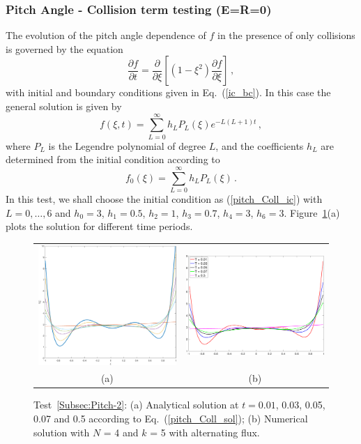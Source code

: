 \documentclass[preprint,11pt]{elsarticle}
\newcommand{\bq}{\begin{equation}}
\newcommand{\eq}{\end{equation}}
\begin{document}
\subsubsection{Pitch Angle - Collision term testing (E=R=0)}
\label{sec:pitch-angle-C}
The evolution of the pitch angle dependence of $f$ in the presence of only collisions is governed by the equation
%
\bq
\label{pitch_Coll_eq}
\frac{\partial f}{\partial t}= \frac{\partial}{\partial\xi} \left[ \left(1-\xi^2\right) \frac{\partial f}{\partial \xi} \right] \, ,
\eq
%
with initial and boundary conditions given in Eq.~(\ref{ic_bc}).
In this case the general solution is given by 
%
\bq
\label{pitch_Coll_sol}
 f(\xi, t)=\sum_{L=0}^\infty h_L P_L(\xi) e^{-L(L+1) t}\, ,
\eq
%
where $P_L$ is the Legendre polynomial of degree $L$, and the coefficients $h_L$ are determined from the initial condition according to
%
\bq
\label{pitch_Coll_ic}
 f_0(\xi)=\sum_{L=0}^\infty h_L P_L(\xi)\, .
\eq
%
In this test, we shall choose the initial condition as (\ref{pitch_Coll_ic}) with $L=0,\dots,6$ and $h_0=3$,  $h_1=0.5$,  $h_2=1$,  $h_3=0.7$,  $h_4=3$,  $h_6=3$.
Figure~\ref{Fig:pitch_coll}(a) plots the solution for different time periods.
%
\begin{figure}[H]
\centering
\begin{tabular}{cc}
 \includegraphics[width=.45\textwidth]{FIGURES/fig_Coll_time-eps-converted-to}
  &\includegraphics[width=.45\textwidth,height=.4\textwidth]{./NumFig/Diff-Deg5_Lev4}\\
  \footnotesize (a) & \footnotesize(b) 
\end{tabular}
\caption{Test~\ref{Subsec:Pitch-2}: (a) Analytical solution at 
$t=0.01$, 0.03, 0.05, 0.07 and 0.5 according to Eq.~(\ref{pitch_Coll_sol}); (b) Numerical solution with $N$ = 4 and $k$ = 5 with alternating flux.}\label{Fig:pitch_coll}
\end{figure}
\end{document}

